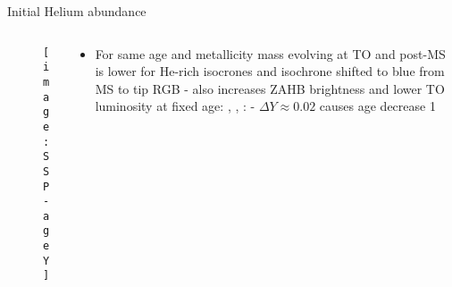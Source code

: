 \begin{frame}{Initial Helium abundance}
\begin{columns}[T]
	\begin{column}{0.5\textwidth}
		\begin{figure}[!ht]
			\texttt{[image: SSP-ageY]}\label{fig:SSP-ageY}
		\end{figure}
	\end{column}
	\begin{column}{0.5\textwidth}
		\begin{itemize}
			\item For same age and metallicity mass evolving at TO and post-MS is lower for He-rich isocrones and isochrone shifted to blue from MS to tip RGB - also increases ZAHB brightness and lower TO luminosity at fixed age: , , :  - $\Delta Y\approx 0.02$ causes age decrease \SI{1}{\giga\year}
		\end{itemize}
	\end{column}
\end{columns}
\end{frame}


